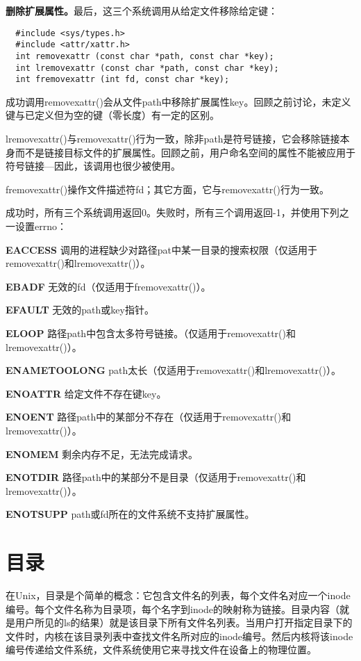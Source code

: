 \textbf{删除扩展属性。}最后，这三个系统调用从给定文件移除给定键：

\begin{lstlisting}
  #include <sys/types.h>
  #include <attr/xattr.h>
  int removexattr (const char *path, const char *key);
  int lremovexattr (const char *path, const char *key);
  int fremovexattr (int fd, const char *key);
\end{lstlisting}

成功调用removexattr()会从文件path中移除扩展属性key。回顾之前讨论，未定义键与已定义但为空的键（零长度）有一定的区别。 

lremovexattr()与removexattr()行为一致，除非path是符号链接，它会移除链接本身而不是链接目标文件的扩展属性。回顾之前，用户命名空间的属性不能被应用于符号链接—因此，该调用也很少被使用。

fremovexattr()操作文件描述符fd；其它方面，它与removexattr()行为一致。

成功时，所有三个系统调用返回0。失败时，所有三个调用返回-1，并使用下列之一设置errno：

\begin{eqlist*}
\item[\textbf{EACCESS}] 调用的进程缺少对路径pat中某一目录的搜索权限（仅适用于removexattr()和lremovexattr()）。
\item[\textbf{EBADF}] 无效的fd（仅适用于fremovexattr()）。
\item[\textbf{EFAULT}] 无效的path或key指针。
\item[\textbf{ELOOP}] 路径path中包含太多符号链接。（仅适用于removexattr()和lremovexattr()）。
\item[\textbf{ENAMETOOLONG}] path太长（仅适用于removexattr()和lremovexattr()）。
\item[\textbf{ENOATTR}] 给定文件不存在键key。
\item[\textbf{ENOENT}] 路径path中的某部分不存在（仅适用于removexattr()和lremovexattr()）。
\item[\textbf{ENOMEM}] 剩余内存不足，无法完成请求。
\item[\textbf{ENOTDIR}] 路径path中的某部分不是目录（仅适用于removexattr()和lremovexattr()）。
\item[\textbf{ENOTSUPP}] path或fd所在的文件系统不支持扩展属性。
\end{eqlist*}

\section{目录}

在Unix，目录是个简单的概念：它包含文件名的列表，每个文件名对应一个inode编号。每个文件名称为目录项，每个名字到inode的映射称为链接。目录内容（就是用户所见的ls的结果）就是该目录下所有文件名列表。当用户打开指定目录下的文件时，内核在该目录列表中查找文件名所对应的inode编号。然后内核将该inode编号传递给文件系统，文件系统使用它来寻找文件在设备上的物理位置。 

